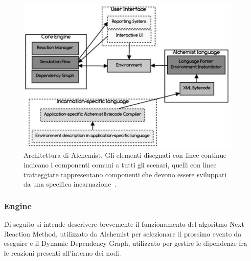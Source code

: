 \documentclass[12pt,a4paper,openright,twoside]{book}
\begin{document}
\begin{figure}
    \centering
    \includegraphics[width=.85\linewidth]{figures/discrete-event-simulation/alchemist-architecture.png}
    \caption{Architettura di Alchemist. Gli elementi disegnati con linee continue indicano i componenti comuni a tutti gli scenari, quelli con linee tratteggiate rappresentano componenti che devono essere sviluppati da una specifica incarnazione~\cite{DBLP:journals/jos/PianiniMV13}.}
    \label{fig:alchemist-architecture}
\end{figure}

\subsubsection{Engine}
Di seguito si intende descrivere brevemente il funzionamento del algoritmo Next Reaction Method, utilizzato da Alchemist per selezionare il prossimo evento da eseguire e il Dynamic Dependency Graph, utilizzato per gestire le dipendenze fra le reazioni presenti all'interno dei nodi. 
\end{document}
